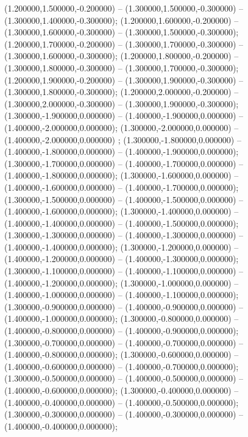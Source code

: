  (1.200000,1.500000,-0.200000) -- (1.300000,1.500000,-0.300000) -- (1.300000,1.400000,-0.300000);
 (1.200000,1.600000,-0.200000) -- (1.300000,1.600000,-0.300000) -- (1.300000,1.500000,-0.300000);
 (1.200000,1.700000,-0.200000) -- (1.300000,1.700000,-0.300000) -- (1.300000,1.600000,-0.300000);
 (1.200000,1.800000,-0.200000) -- (1.300000,1.800000,-0.300000) -- (1.300000,1.700000,-0.300000);
 (1.200000,1.900000,-0.200000) -- (1.300000,1.900000,-0.300000) -- (1.300000,1.800000,-0.300000);
 (1.200000,2.000000,-0.200000) -- (1.300000,2.000000,-0.300000) -- (1.300000,1.900000,-0.300000);
 (1.300000,-1.900000,0.000000) -- (1.400000,-1.900000,0.000000) -- (1.400000,-2.000000,0.000000);
 (1.300000,-2.000000,0.000000) -- (1.400000,-2.000000,0.000000) ;
 (1.300000,-1.800000,0.000000) -- (1.400000,-1.800000,0.000000) -- (1.400000,-1.900000,0.000000);
 (1.300000,-1.700000,0.000000) -- (1.400000,-1.700000,0.000000) -- (1.400000,-1.800000,0.000000);
 (1.300000,-1.600000,0.000000) -- (1.400000,-1.600000,0.000000) -- (1.400000,-1.700000,0.000000);
 (1.300000,-1.500000,0.000000) -- (1.400000,-1.500000,0.000000) -- (1.400000,-1.600000,0.000000);
 (1.300000,-1.400000,0.000000) -- (1.400000,-1.400000,0.000000) -- (1.400000,-1.500000,0.000000);
 (1.300000,-1.300000,0.000000) -- (1.400000,-1.300000,0.000000) -- (1.400000,-1.400000,0.000000);
 (1.300000,-1.200000,0.000000) -- (1.400000,-1.200000,0.000000) -- (1.400000,-1.300000,0.000000);
 (1.300000,-1.100000,0.000000) -- (1.400000,-1.100000,0.000000) -- (1.400000,-1.200000,0.000000);
 (1.300000,-1.000000,0.000000) -- (1.400000,-1.000000,0.000000) -- (1.400000,-1.100000,0.000000);
 (1.300000,-0.900000,0.000000) -- (1.400000,-0.900000,0.000000) -- (1.400000,-1.000000,0.000000);
 (1.300000,-0.800000,0.000000) -- (1.400000,-0.800000,0.000000) -- (1.400000,-0.900000,0.000000);
 (1.300000,-0.700000,0.000000) -- (1.400000,-0.700000,0.000000) -- (1.400000,-0.800000,0.000000);
 (1.300000,-0.600000,0.000000) -- (1.400000,-0.600000,0.000000) -- (1.400000,-0.700000,0.000000);
 (1.300000,-0.500000,0.000000) -- (1.400000,-0.500000,0.000000) -- (1.400000,-0.600000,0.000000);
 (1.300000,-0.400000,0.000000) -- (1.400000,-0.400000,0.000000) -- (1.400000,-0.500000,0.000000);
 (1.300000,-0.300000,0.000000) -- (1.400000,-0.300000,0.000000) -- (1.400000,-0.400000,0.000000);
